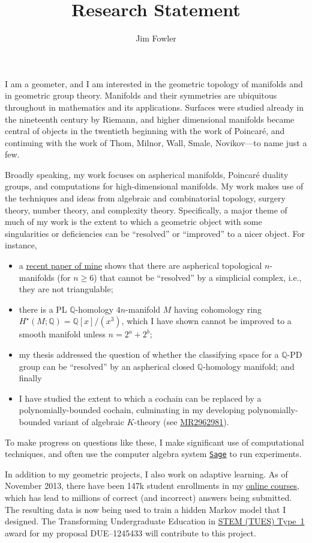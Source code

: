 \documentclass[12pt]{amsart}
\title{Research Statement}
\author{Jim Fowler}
\theoremstyle{definition}
\newcommand{\Q}{\mathbb{Q}}
\begin{document}
\maketitle

I am a geometer, and I am interested in the geometric topology of
manifolds and in geometric group theory.  Manifolds and their
symmetries are ubiquitous throughout in mathematics and its
applications.  Surfaces were studied already in the nineteenth century
by Riemann, and higher dimensional manifolds became central of objects
in the twentieth beginning with the work of Poincar\'e, and continuing
with the work of Thom, Milnor, Wall, Smale, Novikov---to name just a
few.

Broadly speaking, my work focuses on aspherical manifolds, Poincar\'e
duality groups, and computations for high-dimensional manifolds.  My
work makes use of the techniques and ideas from algebraic and
combinatorial topology, surgery theory, number theory, and complexity
theory.  Specifically, a major theme of much of my work is the extent
to which a geometric object with some singularities or deficiencies
can be ``resolved'' or ``improved'' to a nicer object.  For instance,

\begin{itemize}
\item a \href{http://arxiv.org/abs/1304.3730}{recent paper of mine}
  shows that there are aspherical topological $n$-manifolds (for $n
  \geq 6$) that cannot be ``resolved'' by a simplicial complex, i.e.,
  they are not triangulable;
\item there is a PL $\mathbb{Q}$-homology $4n$-manifold $M$ having
  cohomology ring $H^\star(M;\Q) = \Q[x]/(x^3)$, which I have shown
  cannot be improved to a smooth manifold unless $n = 2^a + 2^b$;
\item my thesis addressed the question of whether the classifying
  space for a $\Q$-PD group can be ``resolved'' by an aspherical
  closed $\mathbb{Q}$-homology manifold; and finally
\item I have studied the extent to which a cochain can be replaced by
  a polynomially-bounded cochain, culminating in my developing
  polynomially-bounded variant of algebraic $K$-theory (see
  \href{http://www.ams.org/mathscinet-getitem?mr=2962981}{MR2962981}).
\end{itemize}

To make progress on questions like these, I make significant use of
computational techniques, and often use the computer algebra system
\href{http://sagemath.org/}{\texttt{Sage}} to run experiments.  

In addition to my geometric projects, I also work on adaptive
learning.  As of November 2013, there have been 147k student
enrollments in my \href{http://kisonecat.com/teaching/2014/calculus-two/}{online courses}, which has lead to millions of correct (and incorrect)
answers being submitted.  The resulting data is now being used to
train a hidden Markov model that I designed.  The Transforming
Undergraduate Education in \href{http://www.nsf.gov/funding/pgm_summ.jsp?pims_id=5741}{STEM (TUES) Type~1} award for my proposal
DUE--1245433 will contribute to this project.
\end{document}
